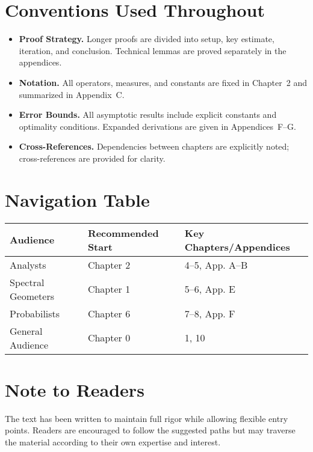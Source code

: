 \section*{Conventions Used Throughout}

\begin{itemize}
  \item \textbf{Proof Strategy.} Longer proofs are divided into setup,
        key estimate, iteration, and conclusion. Technical lemmas are proved
        separately in the appendices.
  \item \textbf{Notation.} All operators, measures, and constants are fixed
        in Chapter~2 and summarized in Appendix~C.
  \item \textbf{Error Bounds.} All asymptotic results include explicit constants
        and optimality conditions. Expanded derivations are given in
        Appendices~F–G.
  \item \textbf{Cross-References.} Dependencies between chapters are explicitly
        noted; cross-references are provided for clarity.
\end{itemize}

\section*{Navigation Table}

\begin{center}
\begin{tabular}{lll}
Audience & Recommended Start & Key Chapters/Appendices \\
\hline
Analysts & Chapter 2 & 4–5, App. A–B \\
Spectral Geometers & Chapter 1 & 5–6, App. E \\
Probabilists & Chapter 6 & 7–8, App. F \\
General Audience & Chapter 0 & 1, 10 \\
\end{tabular}
\end{center}

\section*{Note to Readers}

The text has been written to maintain full rigor while allowing flexible
entry points. Readers are encouraged to follow the suggested paths but
may traverse the material according to their own expertise and interest.
